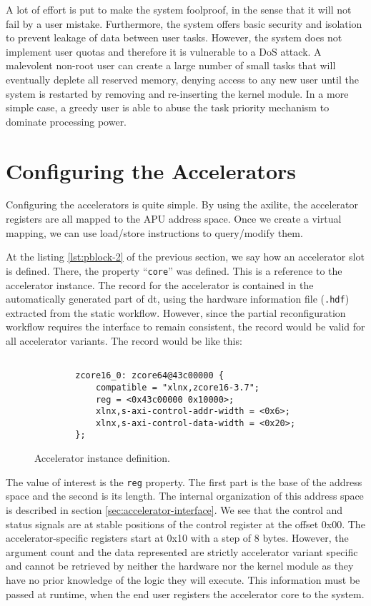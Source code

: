 A lot of effort is put to make the system foolproof, in the sense that it will not fail by a user mistake.
Furthermore, the system offers basic security and isolation to prevent leakage of data between user tasks.
However, the system does not implement user quotas and therefore
it is vulnerable to a DoS attack. A malevolent non-root user can create a large number of small tasks that will
eventually deplete all reserved memory, denying access to any new user until the system is restarted
by removing and re-inserting the kernel module.
In a more simple case, a greedy user is able to abuse the task priority mechanism to dominate processing power.

\section{Configuring the Accelerators}

Configuring the accelerators is quite simple. By using the \gls{axilite}, the accelerator registers
are all mapped to the APU address space. Once we create a virtual mapping, we can use
load/store instructions to query/modify them.

At the listing \ref{lst:pblock-2} of the previous section, we say how an accelerator slot is
defined. There, the property ``\texttt{core}'' was defined. This is a reference to the accelerator
instance. The record for the accelerator is contained in the automatically generated part
of \gls{dt}, using the hardware information file (\texttt{.hdf}) extracted from the static workflow.
However, since the partial reconfiguration workflow requires the interface to remain consistent,
the record would be valid for all accelerator variants. The record would be like this:

\begin{figure}[H]
\centering
\begin{lstlisting}[style=basic]

		zcore16_0: zcore64@43c00000 {
			compatible = "xlnx,zcore16-3.7";
			reg = <0x43c00000 0x10000>;
			xlnx,s-axi-control-addr-width = <0x6>;
			xlnx,s-axi-control-data-width = <0x20>;
		};
\end{lstlisting}
\caption{Accelerator instance definition.}
\label{lst:accelerator-2}
\end{figure}

The value of interest is the \texttt{reg} property. The first part is the base of the address space 
and the second is its length. The internal organization of this address space is described in section 
\ref{sec:accelerator-interface}. We see that the control and status signals are at stable positions
of the control register at the offset 0x00. The accelerator-specific registers start at 0x10 with a
step of 8 bytes. However, the argument count and the data represented are strictly accelerator variant
specific and cannot be retrieved by neither the hardware nor the kernel module as they have no
prior knowledge of the logic they will execute.
This information must be passed at runtime, when the end user registers the accelerator core to the system.

